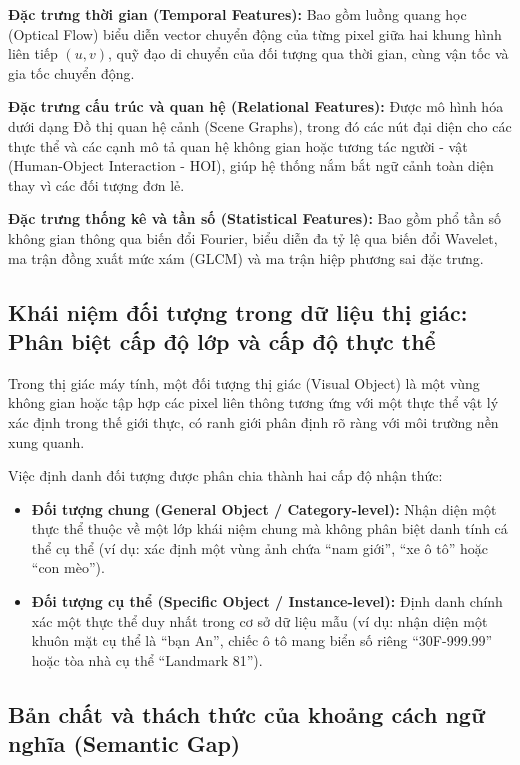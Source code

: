 \textbf{Đặc trưng thời gian (Temporal Features):} Bao gồm luồng quang học (Optical Flow) biểu diễn vector chuyển động của từng pixel giữa hai khung hình liên tiếp $(u, v)$, quỹ đạo di chuyển của đối tượng qua thời gian, cùng vận tốc và gia tốc chuyển động.

\textbf{Đặc trưng cấu trúc và quan hệ (Relational Features):} Được mô hình hóa dưới dạng Đồ thị quan hệ cảnh (Scene Graphs), trong đó các nút đại diện cho các thực thể và các cạnh mô tả quan hệ không gian hoặc tương tác người - vật (Human-Object Interaction - HOI), giúp hệ thống nắm bắt ngữ cảnh toàn diện thay vì các đối tượng đơn lẻ.

\textbf{Đặc trưng thống kê và tần số (Statistical Features):} Bao gồm phổ tần số không gian thông qua biến đổi Fourier, biểu diễn đa tỷ lệ qua biến đổi Wavelet, ma trận đồng xuất mức xám (GLCM) và ma trận hiệp phương sai đặc trưng.

\subsection{Khái niệm đối tượng trong dữ liệu thị giác: Phân biệt cấp độ lớp và cấp độ thực thể}

Trong thị giác máy tính, một đối tượng thị giác (Visual Object) là một vùng không gian hoặc tập hợp các pixel liên thông tương ứng với một thực thể vật lý xác định trong thế giới thực, có ranh giới phân định rõ ràng với môi trường nền xung quanh.

Việc định danh đối tượng được phân chia thành hai cấp độ nhận thức:
\begin{itemize}
    \item \textbf{Đối tượng chung (General Object / Category-level):} Nhận diện một thực thể thuộc về một lớp khái niệm chung mà không phân biệt danh tính cá thể cụ thể (ví dụ: xác định một vùng ảnh chứa ``nam giới'', ``xe ô tô'' hoặc ``con mèo'').
    \item \textbf{Đối tượng cụ thể (Specific Object / Instance-level):} Định danh chính xác một thực thể duy nhất trong cơ sở dữ liệu mẫu (ví dụ: nhận diện một khuôn mặt cụ thể là ``bạn An'', chiếc ô tô mang biển số riêng ``30F-999.99'' hoặc tòa nhà cụ thể ``Landmark 81'').
\end{itemize}

\subsection{Bản chất và thách thức của khoảng cách ngữ nghĩa (Semantic Gap)}

